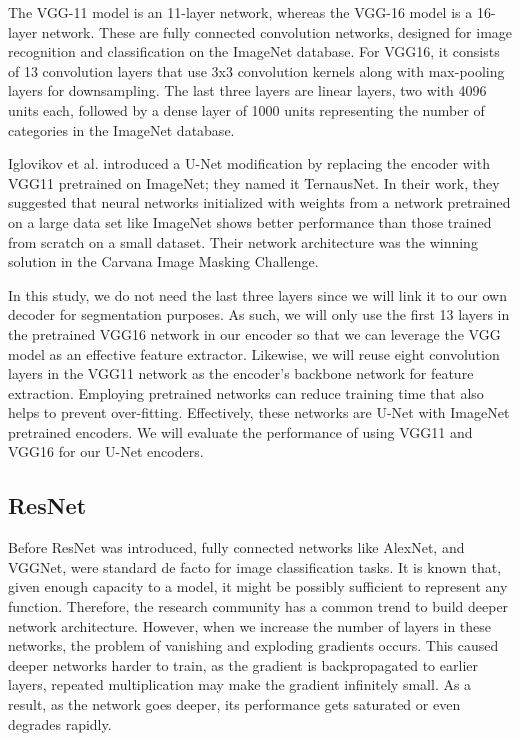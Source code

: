 \documentclass[conference]{IEEEtran}
\begin{document}
The VGG-11 model \cite{simonyan2014very} is an 11-layer network, whereas the VGG-16 model is a 16-layer network. These are fully connected convolution networks, designed for image recognition and classification on the ImageNet database. For VGG16, it consists of 13 convolution layers that use 3x3 convolution kernels along with max-pooling layers for downsampling. The last three layers are linear layers, two with 4096 units each, followed by a dense layer of 1000 units representing the number of categories in the ImageNet database.

Iglovikov et al.\cite{iglovikov2018ternausnet} introduced a U-Net modification by replacing the encoder with VGG11 pretrained on ImageNet; they named it TernausNet. In their work, they suggested that neural networks initialized with weights from a network pretrained on a large data set like ImageNet shows better performance than those trained from scratch on a small dataset. Their network architecture was the winning solution in the Carvana Image Masking Challenge. 

In this study, we do not need the last three layers since we will link it to our own decoder for segmentation purposes. As such, we will only use the first 13 layers in the pretrained VGG16 network in our encoder so that we can leverage the VGG model as an effective feature extractor. Likewise, we will reuse eight convolution layers in the VGG11 network as the encoder's backbone network for feature extraction. Employing pretrained networks can reduce training time that also helps to prevent over-fitting. Effectively, these networks are U-Net with ImageNet pretrained encoders. We will evaluate the performance of using VGG11 and VGG16 for our U-Net encoders.

\subsection{ResNet}

Before ResNet was introduced, fully connected networks like AlexNet, and VGGNet, were standard de facto for image classification tasks. It is known that, given enough capacity to a model, it might be possibly sufficient to represent any function. Therefore, the research community has a common trend to build deeper network architecture. However, when we increase the number of layers in these networks, the problem of vanishing and exploding gradients occurs. This caused deeper networks harder to train, as the gradient is backpropagated to earlier layers, repeated multiplication may make the gradient infinitely small. As a result, as the network goes deeper, its performance gets saturated or even degrades rapidly.
\end{document}
